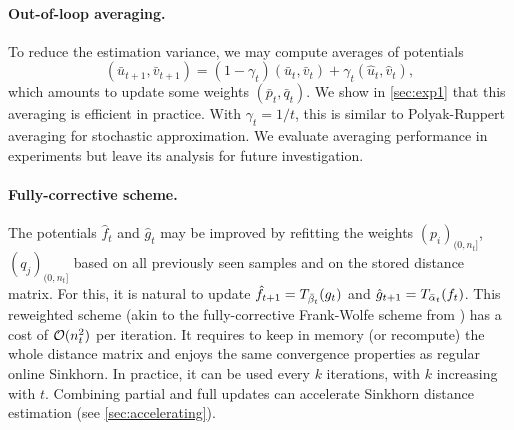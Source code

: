\paragraph{Out-of-loop averaging.} To reduce the estimation variance,
we may compute averages of potentials
\begin{equation}
    (\bar u_{t+1}, \bar v_{t+1}) = (1 - \gamma_t) (\bar u_t, \bar v_t) + \gamma_t (\hat u_t, \hat v_t),
\end{equation}
which amounts to update some weights $(\bar p_t, \bar q_t)$. We show in \autoref{sec:exp1} that
this averaging is efficient in practice.  With $\gamma_t = 1/t$, this
is similar to Polyak-Ruppert  averaging \cite{ruppert1988efficient} for stochastic approximation. We evaluate averaging performance in experiments but leave its analysis for future investigation.


\paragraph{Fully-corrective scheme.} 

The potentials $\hat f_t$ and $\hat g_t$ may be improved by refitting the
weights $(p_i)_{(0, n_t]}$, $(q_j)_{(0, n_t]}$ based on all previously seen
samples and on the stored distance matrix.  For this, it is natural to update $\hat f_{t+1} = \Ctrans{g_t}{\bar \beta_t}$ and
$\hat g_{t+1} = \Ctrans{f_t}{\bar \alpha_t}$. This reweighted scheme (akin to
the fully-corrective Frank-Wolfe scheme from \cite{lacoste2015global}) has a
cost of $\Oo(n_t^2)$ per iteration. It requires to keep in memory (or recompute)
the whole distance matrix and enjoys the same convergence properties as regular online Sinkhorn. In practice, it can be used every $k$ iterations,
with $k$ increasing with $t$. Combining partial and full updates
can accelerate Sinkhorn distance estimation (see \autoref{sec:accelerating}).



